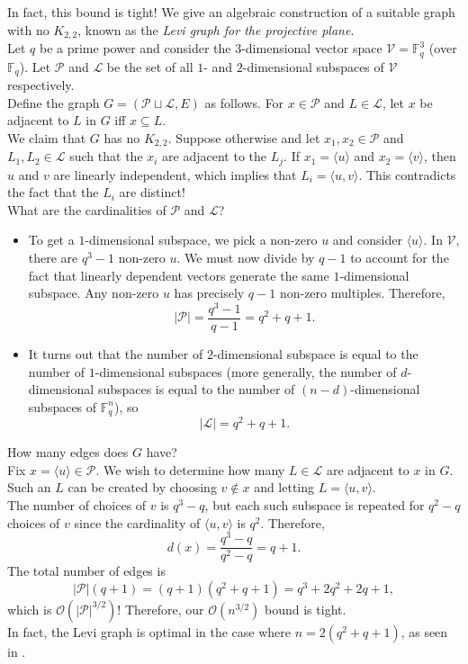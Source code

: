 			In fact, this bound is tight! We give an algebraic construction of a suitable graph with no $K_{2,2}$, known as the \emph{Levi graph for the projective plane}.\\
			Let $q$ be a prime power and consider the $3$-dimensional vector space $\mathcal{V} = \mathbb{F}_q^3$ (over $\mathbb{F}_q$). Let $\mathcal{P}$ and $\mathcal{L}$ be the set of all $1$- and $2$-dimensional subspaces of $\mathcal{V}$ respectively.\\
			Define the graph $G = ( \mathcal{P} \sqcup \mathcal{L} , E )$ as follows. For $x \in \mathcal{P}$ and $L \in \mathcal{L}$, let $x$ be adjacent to $L$ in $G$ iff $x \subseteq L$.\\
			We claim that $G$ has no $K_{2,2}$. Suppose otherwise and let $x_1,x_2\in\mathcal{P}$ and $L_1,L_2\in\mathcal{L}$ such that the $x_i$ are adjacent to the $L_j$. If $x_1 = \langle u \rangle$ and $x_2 = \langle v \rangle$, then $u$ and $v$ are linearly independent, which implies that $L_i = \langle u,v\rangle$. This contradicts the fact that the $L_i$ are distinct!\\
			What are the cardinalities of $\mathcal{P}$ and $\mathcal{L}$?
			\begin{itemize}
				\item To get a $1$-dimensional subspace, we pick a non-zero $u$ and consider $\langle u\rangle$. In $\mathcal{V}$, there are $q^3 - 1$ non-zero $u$. We must now divide by $q-1$ to account for the fact that linearly dependent vectors generate the same $1$-dimensional subspace. Any non-zero $u$ has precisely $q-1$ non-zero multiples. Therefore,
				\[ |\mathcal{P}| = \frac{q^3 - 1}{q - 1} = q^2 + q + 1. \]

				\item It turns out that the number of $2$-dimensional subspace is equal to the number of $1$-dimensional subspaces (more generally, the number of $d$-dimensional subspaces is equal to the number of $(n-d)$-dimensional subspaces of $\mathbb{F}_q^n$), so
				\[ |\mathcal{L}| = q^2 + q + 1. \]
			\end{itemize}
			How many edges does $G$ have?\\
			Fix $x = \langle u \rangle \in \mathcal{P}$. We wish to determine how many $L\in\mathcal{L}$ are adjacent to $x$ in $G$. Such an $L$ can be created by choosing $v \not\in x$ and letting $L = \langle u,v\rangle$.\\The number of choices of $v$ is $q^3 - q$, but each such subspace is repeated for $q^2 - q$ choices of $v$ since the cardinality of $\langle u,v\rangle$ is $q^2$. Therefore,
			\[ d(x) = \frac{q^3 - q}{q^2 - q} = q + 1. \]
			The total number of edges is
			\[ |\mathcal{P}| (q + 1) = (q+1)(q^2+q+1) = q^3 + 2q^2 + 2q + 1, \]
			which is $\mathcal{O}(|\mathcal{P}|^{3/2})$!
			Therefore, our $\mathcal{O}(n^{3/2})$ bound is tight.\\
			In fact, the Levi graph is optimal in the case where $n = 2(q^2 + q + 1)$, as seen in .

